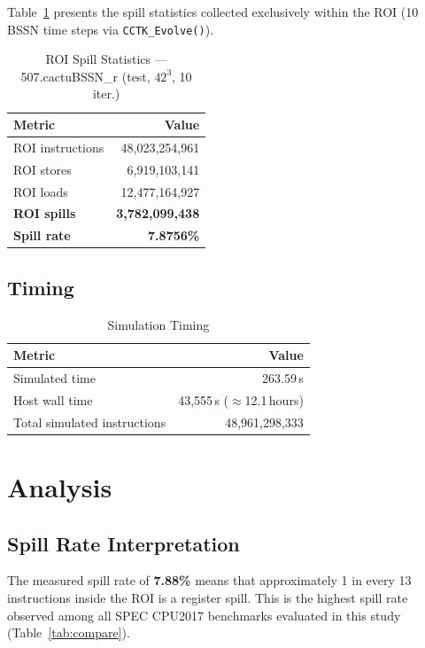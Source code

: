 \documentclass[conference]{IEEEtran}
\begin{document}
Table~\ref{tab:roi} presents the spill statistics collected exclusively
within the ROI (10 BSSN time steps via \texttt{CCTK\_Evolve()}).

\begin{table}[H]
\centering
\caption{ROI Spill Statistics --- 507.cactuBSSN\_r (test, $42^3$, 10 iter.)}
\label{tab:roi}
\begin{tabular}{lr}
\toprule
\textbf{Metric} & \textbf{Value} \\
\midrule
ROI instructions         & 48,023,254,961 \\
ROI stores               &  6,919,103,141 \\
ROI loads                & 12,477,164,927 \\
\midrule
\textbf{ROI spills}      & \textbf{3,782,099,438} \\
\textbf{Spill rate}      & \textbf{7.8756\%} \\
\bottomrule
\end{tabular}
\end{table}

\subsection{Timing}

\begin{table}[H]
\centering
\caption{Simulation Timing}
\label{tab:timing}
\begin{tabular}{lr}
\toprule
\textbf{Metric} & \textbf{Value} \\
\midrule
Simulated time           & 263.59\,s \\
Host wall time           & 43,555\,s ($\approx$12.1\,hours) \\
Total simulated instructions & 48,961,298,333 \\
\bottomrule
\end{tabular}
\end{table}

\section{Analysis}

\subsection{Spill Rate Interpretation}

The measured spill rate of \textbf{7.88\%} means that approximately
1 in every 13 instructions inside the ROI is a register spill.
This is the highest spill rate observed among all SPEC CPU2017
benchmarks evaluated in this study (Table~\ref{tab:compare}).
\end{document}
